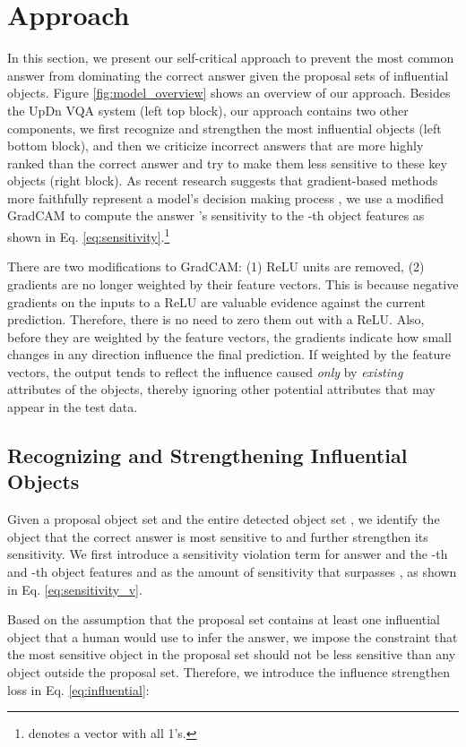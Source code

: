 \documentclass{article}
\begin{document}
\section{Approach}
In this section, we present our self-critical approach to prevent the most common answer from dominating the correct answer given the proposal sets of influential objects. Figure \ref{fig:model_overview} shows an overview of our approach. Besides the UpDn VQA system (left top block), our approach contains two other components, we first recognize and strengthen the most influential objects (left bottom block), and then we criticize incorrect answers that are more highly ranked than the correct answer and try to make them less sensitive to these key objects (right block). As recent research suggests that gradient-based methods more faithfully represent a model's decision making process \cite{selvaraju2019taking,zhang2018top,wu2018dynamic,jain2019attention}, we use a modified GradCAM \cite{selvaraju2017grad} to compute the answer 's sensitivity to the -th object features  as shown in Eq. \ref{eq:sensitivity}.\footnote{ denotes a vector with all 1's. }

There are two modifications to GradCAM: (1) ReLU units are removed, (2) gradients are no longer weighted by their feature vectors. This is because negative gradients on the inputs to a ReLU are valuable evidence against the current prediction. Therefore, there is no need to zero them out with a ReLU. Also, before they are weighted by the feature vectors, the gradients indicate how small changes in any direction influence the final prediction. If weighted by the feature vectors, the output tends to reflect the influence caused {\it only} by {\it existing} attributes of the objects, thereby ignoring other potential attributes that may appear in the test data.



\subsection{Recognizing and Strengthening Influential Objects}
Given a proposal object set  and the entire detected object set , we identify the object that the correct answer is most sensitive to and further strengthen its sensitivity. 
We first introduce a sensitivity violation term  for answer  and the -th and -th object features  and  as the amount of sensitivity that  surpasses , as shown in Eq. \ref{eq:sensitivity_v}.

Based on the assumption that the proposal set contains at least one influential object that a human would use to infer the answer, we impose the constraint that the most sensitive object in the proposal set should not be less sensitive than any object outside the proposal set. Therefore, we introduce the influence strengthen loss  in Eq. \ref{eq:influential}:
\end{document}
